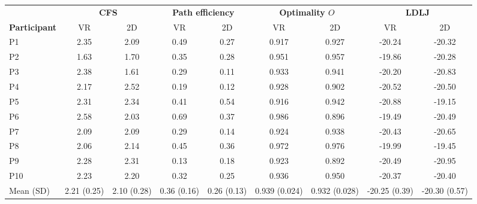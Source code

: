 \begin{tabular}{lcccccccc}
\toprule
& \multicolumn{2}{c}{\textbf{CFS}} & \multicolumn{2}{c}{\textbf{Path efficiency}} & \multicolumn{2}{c}{\textbf{Optimality $O$}} & \multicolumn{2}{c}{\textbf{LDLJ}} \\
\cmidrule(lr){2-3}\cmidrule(lr){4-5}\cmidrule(lr){6-7}\cmidrule(lr){8-9}
\textbf{Participant} & VR & 2D & VR & 2D & VR & 2D & VR & 2D \\
\midrule
P1 & 2.35 & 2.09 & 0.49 & 0.27 & 0.917 & 0.927 & -20.24 & -20.32 \\
P2 & 1.63 & 1.70 & 0.35 & 0.28 & 0.951 & 0.957 & -19.86 & -20.28 \\
P3 & 2.38 & 1.61 & 0.29 & 0.11 & 0.933 & 0.941 & -20.20 & -20.83 \\
P4 & 2.17 & 2.52 & 0.19 & 0.12 & 0.928 & 0.902 & -20.52 & -20.50 \\
P5 & 2.31 & 2.34 & 0.41 & 0.54 & 0.916 & 0.942 & -20.88 & -19.15 \\
P6 & 2.58 & 2.03 & 0.69 & 0.37 & 0.986 & 0.896 & -19.49 & -20.49 \\
P7 & 2.09 & 2.09 & 0.29 & 0.14 & 0.924 & 0.938 & -20.43 & -20.65 \\
P8 & 2.06 & 2.14 & 0.45 & 0.36 & 0.972 & 0.976 & -19.99 & -19.45 \\
P9 & 2.28 & 2.31 & 0.13 & 0.18 & 0.923 & 0.892 & -20.49 & -20.95 \\
P10 & 2.23 & 2.20 & 0.32 & 0.25 & 0.936 & 0.950 & -20.37 & -20.40 \\
\midrule
Mean (SD) & 2.21 (0.25) & 2.10 (0.28) & 0.36 (0.16) & 0.26 (0.13) & 0.939 (0.024) & 0.932 (0.028) & -20.25 (0.39) & -20.30 (0.57) \\
\bottomrule
\end{tabular}
